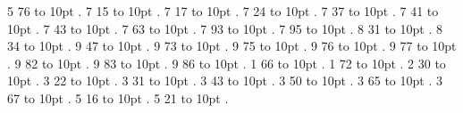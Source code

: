 \smallskip
{} 5 76 \leaders\hbox to 10pt {\hss.\hss}  \hfill {}
\smallskip
{} 7 15 \leaders\hbox to 10pt {\hss.\hss}  \hfill {}
\smallskip
{} 7 17 \leaders\hbox to 10pt {\hss.\hss}  \hfill {}
\smallskip
{} 7 24 \leaders\hbox to 10pt {\hss.\hss}  \hfill {}
\smallskip
{} 7 37 \leaders\hbox to 10pt {\hss.\hss}  \hfill {}
\smallskip
{} 7 41 \leaders\hbox to 10pt {\hss.\hss}  \hfill {}
\smallskip
{} 7 43 \leaders\hbox to 10pt {\hss.\hss}  \hfill {}
\smallskip
{} 7 63 \leaders\hbox to 10pt {\hss.\hss}  \hfill {}
\smallskip
{} 7 93 \leaders\hbox to 10pt {\hss.\hss}  \hfill {}
\smallskip
{} 7 95 \leaders\hbox to 10pt {\hss.\hss}  \hfill {}
\smallskip
{} 8 31 \leaders\hbox to 10pt {\hss.\hss}  \hfill {}
\smallskip
{} 8 34 \leaders\hbox to 10pt {\hss.\hss}  \hfill {}
\smallskip
{} 9 47 \leaders\hbox to 10pt {\hss.\hss}  \hfill {}
\smallskip
{} 9 73 \leaders\hbox to 10pt {\hss.\hss}  \hfill {}
\smallskip
{} 9 75 \leaders\hbox to 10pt {\hss.\hss}  \hfill {}
\smallskip
{} 9 76 \leaders\hbox to 10pt {\hss.\hss}  \hfill {}
\smallskip
{} 9 77 \leaders\hbox to 10pt {\hss.\hss}  \hfill {}
\smallskip
{} 9 82 \leaders\hbox to 10pt {\hss.\hss}  \hfill {}
\smallskip
{} 9 83 \leaders\hbox to 10pt {\hss.\hss}  \hfill {}
\smallskip
{} 9 86 \leaders\hbox to 10pt {\hss.\hss}  \hfill {}
\smallskip
{} 1 66 \leaders\hbox to 10pt {\hss.\hss}  \hfill {}
\smallskip
{} 1 72 \leaders\hbox to 10pt {\hss.\hss}  \hfill {}
\smallskip
{} 2 30 \leaders\hbox to 10pt {\hss.\hss}  \hfill {}
\smallskip
{} 3 22 \leaders\hbox to 10pt {\hss.\hss}  \hfill {}
\smallskip
{} 3 31 \leaders\hbox to 10pt {\hss.\hss}  \hfill {}
\smallskip
{} 3 43 \leaders\hbox to 10pt {\hss.\hss}  \hfill {}
\smallskip
{} 3 50 \leaders\hbox to 10pt {\hss.\hss}  \hfill {}
\smallskip
{} 3 65 \leaders\hbox to 10pt {\hss.\hss}  \hfill {}
\smallskip
{} 3 67 \leaders\hbox to 10pt {\hss.\hss}  \hfill {}
\smallskip
{} 5 16 \leaders\hbox to 10pt {\hss.\hss}  \hfill {}
\smallskip
{} 5 21 \leaders\hbox to 10pt {\hss.\hss}  \hfill {}

